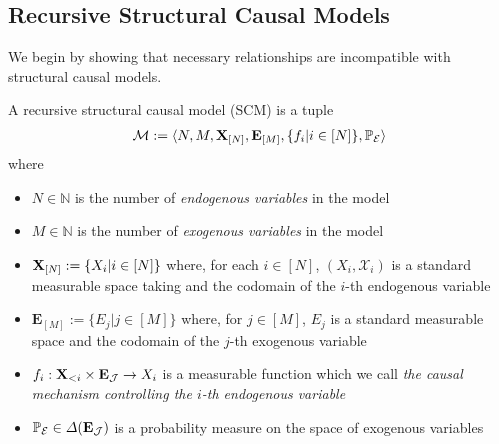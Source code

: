 \subsection{Recursive Structural Causal Models}

We begin by showing that necessary relationships are incompatible with structural causal models.

\begin{definition}\label{def:acSCM}
A recursive structural causal model (SCM) is a tuple 
	\begin{align}
		\mathcal{M}:=\langle N,M,\mathbf{X}_{[N]},\mathbf{E}_{[M]},\{f_i|i\in[N]\},\mathbb{P}_{\mathcal{E}}\rangle
	\end{align}
	where 
	\begin{itemize}
		\item $N\in \mathbb{N}$ is the number of \emph{endogenous variables} in the model
		\item $M\in \mathbb{N}$ is the number of \emph{exogenous variables} in the model
		\item $\mathbf{X}_{[N]}:=\{X_i|i\in[N]\}$ where, for each $i\in [N]$, $(X_i,\mathcal{X}_i)$ is a standard measurable space taking and the codomain of the $i$-th endogenous variable
		\item $\mathbf{E}_{[M]}:=\{E_j|j\in[M]\}$ where, for $j\in [M]$, $E_j$ is a standard measurable space and the codomain of the $j$-th exogenous variable
		\item $f_i:\mathbf{X}_{<i}\times\mathbf{E}_{\mathcal{J}}\to X_i$ is a measurable function which we call \emph{the causal mechanism controlling the $i$-th endogenous variable}
		\item $\mathbb{P}_{\mathcal{E}}\in \Delta(\mathbf{E}_{\mathcal{J}})$ is a probability measure on the space of exogenous variables
	\end{itemize}
\end{definition}

